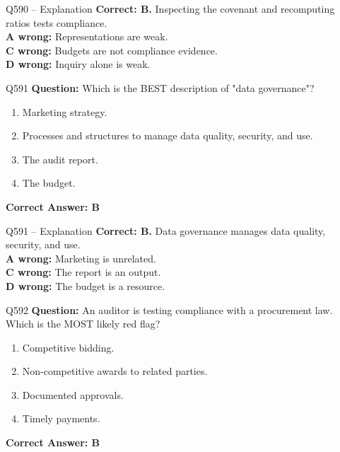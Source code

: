 \documentclass[aspectratio=169,10pt]{beamer}
\begin{document}
	\begin{frame}[t]{Q590 -- Explanation}
		\small
		\textbf{Correct: B.} Inspecting the covenant and recomputing ratios tests compliance. \\[4pt]
		\textbf{A wrong:} Representations are weak. \\[2pt]
		\textbf{C wrong:} Budgets are not compliance evidence. \\[2pt]
		\textbf{D wrong:} Inquiry alone is weak.
	\end{frame}
	
	\begin{frame}[t]{Q591}
		\small
		\textbf{Question:} Which is the BEST description of "data governance"?
		\begin{enumerate}[label=\Alph*.,itemsep=1pt,topsep=2pt]
			\item Marketing strategy.
			\item Processes and structures to manage data quality, security, and use.
			\item The audit report.
			\item The budget.
		\end{enumerate}
		\vspace{4pt}
		\textbf{Correct Answer: B}
	\end{frame}
	
	\begin{frame}[t]{Q591 -- Explanation}
		\small
		\textbf{Correct: B.} Data governance manages data quality, security, and use. \\[4pt]
		\textbf{A wrong:} Marketing is unrelated. \\[2pt]
		\textbf{C wrong:} The report is an output. \\[2pt]
		\textbf{D wrong:} The budget is a resource.
	\end{frame}
	
	\begin{frame}[t]{Q592}
		\small
		\textbf{Question:} An auditor is testing compliance with a procurement law. Which is the MOST likely red flag?
		\begin{enumerate}[label=\Alph*.,itemsep=1pt,topsep=2pt]
			\item Competitive bidding.
			\item Non-competitive awards to related parties.
			\item Documented approvals.
			\item Timely payments.
		\end{enumerate}
		\vspace{4pt}
		\textbf{Correct Answer: B}
	\end{frame}
	
\end{document}
